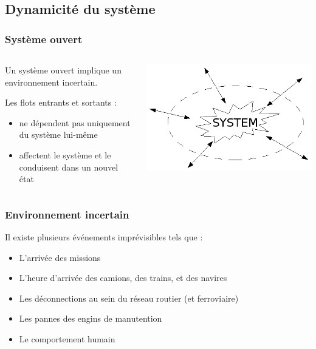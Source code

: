 \documentclass{beamer}
\begin{document}
\subsection*{Dynamicité du système}
\begin{frame}
\frametitle{Système ouvert}
	\begin{columns}
		\begin{column}[l]{8cm}
			Un système ouvert implique un environnement incertain.

			Les flots entrants et sortants : 
			\begin{itemize}
				\item ne dépendent pas uniquement du système lui-même
				\item affectent le système et le conduisent dans un nouvel état
			\end{itemize}
		\end{column}
		\begin{column}[r]{4cm}
			\begin{center}
				\includegraphics[height=.30\textheight]{fig/openSystem.png}
			\end{center}
	 	\end{column}
	\end{columns}
\end{frame}
\begin{frame}
\frametitle{Environnement incertain}
	Il existe plusieurs événements imprévisibles tels que :
	  \begin{itemize}
	  \item L'arrivée des missions
	  \item L'heure d'arrivée des camions, des  trains, et des navires
	  \item Les déconnections au sein du réseau routier (et ferroviaire)
	  \item Les pannes des engins de manutention
	  \item Le comportement humain
	\end{itemize}
\end{frame}
\end{document}
